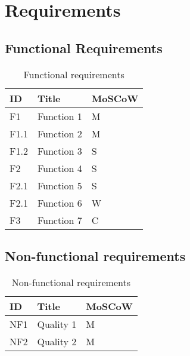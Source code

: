\section{Requirements}

\subsection*{Functional Requirements}

\begin{table}[H]
\caption{Functional requirements}
\centering
\begin{tabular}{|l|l|l|}
\hline

\textbf{ID}  & \textbf{Title}     & \textbf{MoSCoW} \\ \hline
F1           & Function 1         & M               \\ \hline
F1.1         & Function 2         & M               \\ \hline
F1.2         & Function 3         & S               \\ \hline
F2           & Function 4         & S               \\ \hline
F2.1         & Function 5         & S               \\ \hline
F2.1         & Function 6         & W               \\ \hline
F3           & Function 7         & C               \\ \hline
\end{tabular}
\label{tab:frequirements}
\end{table}




\subsection*{Non-functional requirements}
\begin{table}[H]
\caption{Non-functional requirements}
\centering
\begin{tabular}{|l|l|l|}
\hline
\textbf{ID}  & \textbf{Title}   & \textbf{MoSCoW}  \\ \hline
NF1          & Quality 1        & M                \\ \hline
NF2          & Quality 2        & M                \\ \hline
\end{tabular}
\label{tab:nfrequirements}
\end{table}